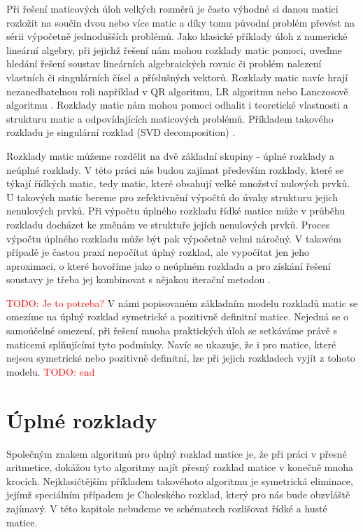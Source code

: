 \documentclass[11pt,american,czech,oneside]{book}
\theoremstyle{plain}
\theoremstyle{definition}
\newcommand{\TODO}[1]{\textcolor{red}{TODO: #1}}
\begin{document}
Při řešení maticových úloh velkých rozměrů je často výhodné si danou matici rozložit na součin dvou nebo více matic a díky tomu původní problém převést na sérii výpočetně jednodušších problémů. Jako klasické příklady úloh z numerické lineární algebry, při jejichž řešení nám mohou rozklady matic pomoci, uveďme hledání řešení soustav lineárních algebraických rovnic či problém nalezení vlastních či singulárních čísel a příslušných vektorů. Rozklady matic navíc hrají nezanedbatelnou roli například v QR algoritmu, LR algoritmu \cite{govl:83} nebo Lanczosově algoritmu \cite{lanc:50,paig:72}. Rozklady matic nám mohou pomoci odhalit i teoretické vlastnosti a strukturu matic a odpovídajících maticových problémů. Příkladem takového rozkladu je singulární rozklad (SVD decomposition) \cite{govl:83}.

Rozklady matic můžeme rozdělit na dvě základní skupiny - úplné rozklady a neúplné rozklady. V této práci nás budou zajímat především rozklady, které se týkají řídkých matic, tedy matic, které obsahují velké množství nulových prvků. U takových matic bereme pro zefektivnění výpočtů do úvahy strukturu jejich nenulových prvků. Při výpočtu úplného rozkladu řídké matice může v průběhu rozkladu docházet ke změnám ve struktuře jejích nenulových prvků. Proces výpočtu úplného rozkladu může být pak výpočetně velmi náročný. V takovém případě je častou praxí nepočítat úplný rozklad, ale vypočítat jen jeho aproximaci, o které hovoříme jako o neúplném rozkladu a pro získání řešení soustavy je třeba jej kombinovat s nějakou iterační metodou \cite{temp94}. 

\TODO{Je to potreba?}
V námi popisovaném základním modelu rozkladů matic se omezíme na úplný rozklad symetrické a pozitivně definitní matice. Nejedná se o samoúčelné omezení, při řešení mnoha praktických úloh se setkáváme právě s maticemi splňujícími tyto podmínky. Navíc se ukazuje, že i pro matice, které nejsou symetrické nebo pozitivně definitní, lze při jejich rozkladech vyjít z tohoto modelu.
\TODO{end}

\section{Úplné rozklady}

Společným znakem algoritmů pro úplný rozklad matice je, že při práci v přesné aritmetice, dokážou tyto algoritmy najít přesný rozklad matice v konečně mnoha krocích. Nejklasičtějším příkladem takovéhoto algoritmu je symetrická eliminace, jejímž speciálním případem je Choleského rozklad, který pro nás bude obzvláště zajímavý. V této kapitole nebudeme ve schématech rozlišovat řídké a husté matice.
\end{document}
